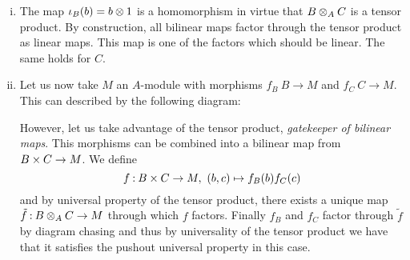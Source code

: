 \documentclass[12pt]{memoir}
\begin{document}
\begin{ptcbr}
    \begin{enumerate}[i)]
        \itemsep=-0.4em
        \item The map $\iota_B(b)=b\otimes 1$ is a homomorphism in virtue that $B\otimes_AC$ is a tensor product. By construction, all bilinear maps factor through the tensor product as linear maps. This map is one of the factors which should be linear. The same holds for $C$. 
        \item Let us now take $M$ an $A$-module with morphisms $f_B\:B\to M$ and $f_C\: C\to M$. This can described by the following diagram:
        \begin{center}
        \end{center}
        However, let us take advantage of the tensor product, \emph{gatekeeper of bilinear maps}. This morphisms can be combined into a bilinear map from $B\times C\to M$. We define 
        $$f\mathbin{:} B\times C\to M,\ (b,c)\mapsto f_B(b)f_C(c)$$
        and by universal property of the tensor product, there exists a unique map $\tilde{f}\mathbin{:} B\otimes_AC\to M$ through which $f$ factors. Finally $f_B$ and $f_C$ factor through $\tilde{f}$ by diagram chasing and thus by universality of the tensor product we have that it satisfies the pushout universal property in this case.
    \end{enumerate}


\end{ptcbr}
\end{document}
